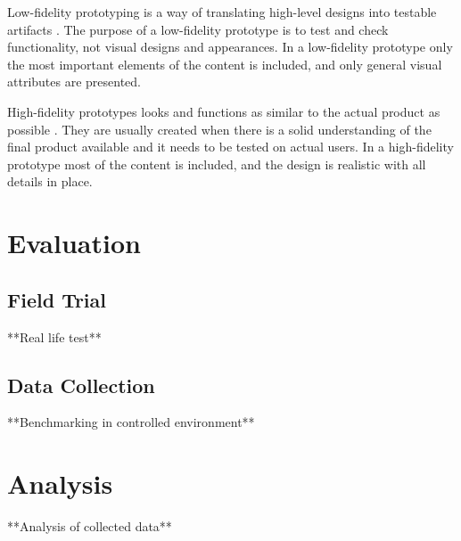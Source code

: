 \documentclass[../Main/thesis.tex]{subfiles}
\begin{document}
Low-fidelity prototyping is a way of translating high-level designs into testable artifacts \citep{Babich2017}.
The purpose of a low-fidelity prototype is to test and check functionality, not visual designs and appearances.
In a low-fidelity prototype only the most important elements of the content is included, and only general visual attributes are presented.

High-fidelity prototypes looks and functions as similar to the actual product as possible \citep{Babich2017}.
They are usually created when there is a solid understanding of the final product available and it needs to be tested on actual users.
In a high-fidelity prototype most of the content is included, and the design is realistic with all details in place.




\section{Evaluation}
\subsection{Field Trial}
**Real life test**

\subsection{Data Collection}
**Benchmarking in controlled environment**

\section{Analysis}
**Analysis of collected data**
\end{document}
